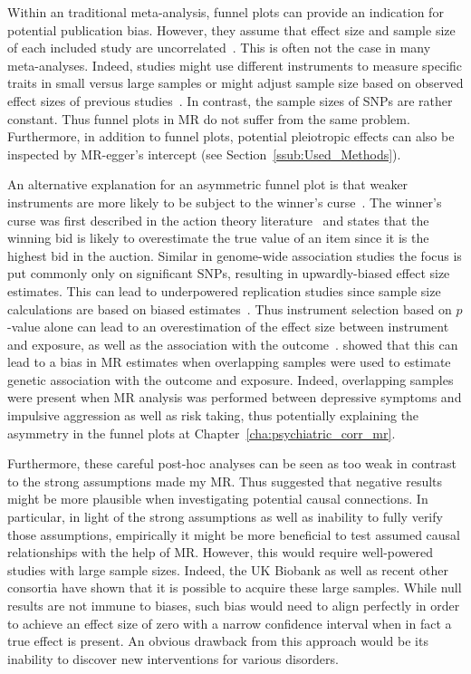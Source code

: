 Within an traditional meta-analysis, funnel plots can provide an indication for potential publication bias.
However, they assume that effect size and sample size of each included study are uncorrelated~\cite{Evans2013}.
This is often not the case in many meta-analyses.
Indeed, studies might use different instruments to measure specific traits in small versus large samples or  might adjust sample size based on observed effect sizes of previous studies~\cite{Simonsohn}.
In contrast, the sample sizes of SNPs are rather constant.
Thus funnel plots in MR do not suffer from the same problem.
Furthermore, in addition to funnel plots, potential pleiotropic effects can also be inspected by MR-egger's intercept (see Section~\ref{ssub:Used_Methods}).

An alternative explanation for an asymmetric funnel plot is that weaker instruments are more likely to be subject to the winner's curse~\cite{Taylor2014}.
The winner's curse was first described in the action theory literature~\cite{Bazerman1983} and states that the winning bid is likely to overestimate the true value of an item since it is the highest bid in the auction.
Similar in genome-wide association studies the focus is put commonly only  on significant SNPs, resulting in upwardly-biased effect size estimates.
This can lead to underpowered replication studies since sample size calculations are based on biased estimates~\cite{Xiao2008}.
Thus instrument selection based on $p$-value alone can lead to an overestimation of the effect size between instrument and exposure, as well as  the association with the outcome~\cite{Bowden2015a}.
\citet{Taylor2014} showed that this can lead to a bias in MR estimates when overlapping samples were used to estimate genetic association with the outcome and exposure.
Indeed, overlapping samples were present when MR analysis was performed between depressive symptoms and impulsive aggression as well as risk taking,
thus potentially explaining the asymmetry in the funnel plots at Chapter~\ref{cha:psychiatric_corr_mr}.

Furthermore, these careful post-hoc analyses can be seen as too weak in contrast to the strong assumptions made my MR\@. 
Thus \citet{Vanderweele2015} suggested that negative results might be more plausible when investigating potential causal connections.
In particular, in light of the strong assumptions as well as inability to fully verify those assumptions, empirically it might be more beneficial to test assumed causal relationships with the help of MR\@.
However, this would require well-powered studies with large sample sizes.
Indeed, the UK Biobank as well as recent other consortia have shown that it is possible to acquire these large samples.
While null results are not immune to biases, such bias would need to align perfectly in order to achieve an effect size of zero with a narrow confidence interval when in fact a true effect is present.
An obvious drawback from this approach would be its inability to discover new interventions for various disorders. 

